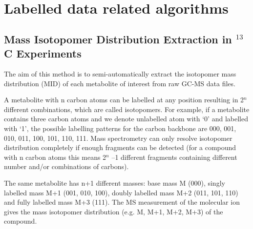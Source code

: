 

\chapter{Labelled data related algorithms}


\section
{Mass Isotopomer Distribution Extraction in $^{13}$C Experiments}


The aim of this method is to semi-automatically extract the isotopomer mass
distribution (MID) of each metabolite of interest from raw GC-MS data files.

A metabolite with n carbon atoms can be labelled at any position resulting in
2$^{n}$ different combinations, which are called isotopomers. For example, 
if a metabolite contains three carbon atoms and we denote unlabelled atom with
 ‘0’ and labelled with ‘1’, the possible labelling patterns for the carbon 
backbone are 000, 001, 010, 011, 100, 101, 110, 111. Mass spectrometry can only
resolve isotopomer distribution completely if enough fragments can be detected 
(for a compound with n carbon atoms this means 2$^{n}$ –1 different fragments 
containing different number and/or combinations of carbons).

The same metabolite has n+1 different masses: base mass M (000), singly labelled
mass M+1 (001, 010, 100), doubly labelled mass M+2 (011, 101, 110) and fully 
labelled mass M+3 (111). The MS measurement of the molecular ion gives the mass 
isotopomer distribution (e.g. M, M+1, M+2, M+3) of the compound.

